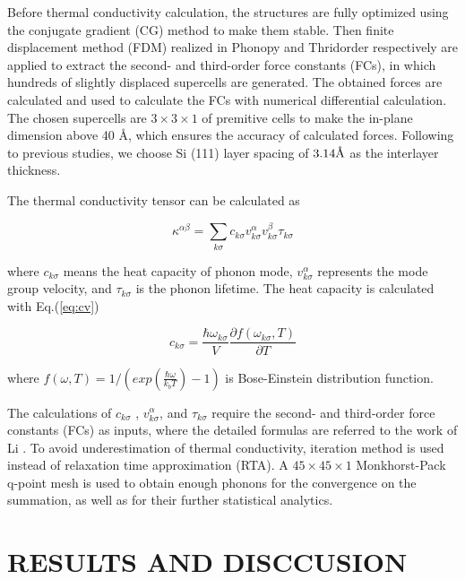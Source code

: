 \documentclass[aps,prb,twocolumn,showpacs,amsmath,amssymb]{revtex4-1}
\newcommand{\angstrom}{\mbox{\normalfont\AA}}
\begin{document}
Before thermal conductivity calculation, the  structures are fully optimized using the conjugate gradient (CG) method to make them stable.  Then finite displacement method (FDM) realized in Phonopy\cite{Togo2008} and Thridorder respectively are applied to extract the second- and third-order force constants (FCs), in which hundreds of  slightly displaced supercells are generated. The obtained forces are calculated and used to calculate the FCs with numerical differential calculation. The chosen supercells are $3 \times 3 \times 1$ of premitive cells to make the in-plane dimension above 40 \angstrom, which ensures  the accuracy of calculated forces. Following to previous studies, we choose Si (111) layer spacing of $3.14 \angstrom$ as the interlayer thickness.

The thermal conductivity tensor can be calculated as

\begin{equation}
  \kappa^{\alpha\beta} = \sum_{k \sigma}{c_{k \sigma}v^{\alpha}_{k \sigma}v^{\beta}_{k \sigma}\tau_{k \sigma}} \label{eq:kappasum}
\end{equation}

where $c_{k \sigma}$ means the heat capacity of phonon mode,  $v_{k \sigma}^{\alpha}$ represents the mode group velocity, and $\tau_{k \sigma}$ is the phonon lifetime. The heat capacity is calculated with Eq.(\ref{eq:cv})

\begin{equation}
  c_{k \sigma}=\frac{\hbar \omega_{k \sigma} }{V} \frac{\partial f(\omega_{k \sigma},T)}{\partial T} \label{eq:cv}
\end{equation}

where $ f(\omega,T)=1/(exp(\frac{\hbar \omega}{k_b T})-1)$ is Bose-Einstein distribution function.

The calculations of $c_{k\sigma}$ , $v_{k \sigma}^{\alpha}$, and $\tau_{k\sigma}$ require the second- and third-order force constants (FCs) as inputs, where the detailed formulas are referred to the work of  Li \cite{Li2014}. To avoid underestimation of thermal conductivity, iteration method is used instead of relaxation time approximation (RTA). A $45\times 45 \times 1$ Monkhorst-Pack q-point mesh is used to obtain enough phonons for the convergence on the summation, as well as for their further statistical analytics.

\section{RESULTS AND DISCCUSION}
\end{document}
